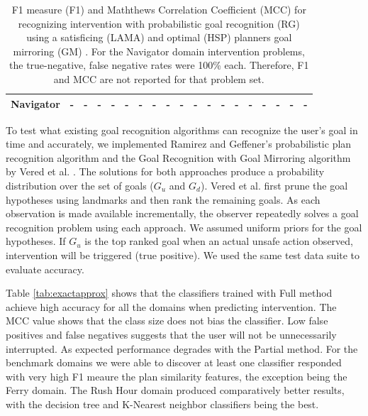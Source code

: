 \documentclass[letterpaper]{article}
\theoremstyle{plain}
\begin{document}
\begin{table}[tb]
{\begin{tabular}{|l|ll|ll|ll|ll|ll|ll|ll|ll|ll|}
\textbf{Navigator}                            & -                       & -                        & -                       & -   & -                       & -   & -                        & -   & -                       & -   & -                       & -   & -                        & -   & -                       & -   & -                       & -   \\ \hline
\end{tabular}%
}
\caption{F1 measure (F1) and Maththews Correlation Coefficient (MCC) for recognizing intervention with probabilistic goal recognition (RG)  \cite{ramirez2010probabilistic} using a satisficing (LAMA) and optimal (HSP) planners goal mirroring (GM) \cite{vered2018goalrec}. For the Navigator domain intervention problems, the true-negative, false negative rates were 100\%  each. Therefore, F1 and MCC are not reported for that problem set.}
\label{tab:rgv}
\end{table}

To test what existing goal recognition algorithms can recognize the user's goal in time and accurately, we implemented Ramirez and Geffener's probabilistic plan recognition algorithm \cite{ramirez2010probabilistic} and the Goal Recognition with Goal Mirroring algorithm by Vered et al. . The solutions for both approaches produce a probability distribution over the set of goals ($G_u$ and $G_d$). Vered et al. first prune the goal hypotheses using landmarks and then rank the remaining goals. As each observation is made available incrementally, the observer repeatedly solves a goal recognition problem using each approach. We assumed uniform priors for the goal hypotheses. If $G_u$ is the top ranked goal when an actual unsafe action observed, intervention will be triggered (true positive). We used the same test data suite to evaluate accuracy.

Table \ref{tab:exactapprox} shows that the classifiers trained with Full method achieve high accuracy for all the domains when predicting intervention. The MCC value shows that the class size does not bias the classifier. Low false positives and false negatives suggests that the user will not be unnecessarily interrupted. As expected performance degrades with the Partial method. For the benchmark domains we were able to discover at least one classifier responded with very high F1 meaure the plan similarity features, the exception being the Ferry domain. The Rush Hour domain produced comparatively better results, with the decision tree and K-Nearest neighbor classifiers being the best. 
\end{document}
